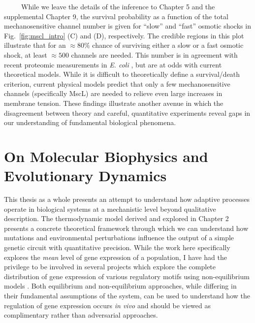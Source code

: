\documentclass[12pt]{caltech_thesis}
\begin{document}
~~~~~While we leave the details of the inference to Chapter 5 and the
supplemental Chapter 9, the survival probability as a function of the
total mechanosensitive channel number is given for ``slow'' and ``fast''
osmotic shocks in Fig.~\ref{fig:mscl_intro} (C) and (D), respectively.
The credible regions in this plot illustrate that for an
\(\approx 80\%\) chance of surviving either a slow or a fast osmotic
shock, at least \(\approx 500\) channels are needed. This number is in
agreement with recent proteomic measurements in \emph{E. coli}
\autocite{li2014,schmidt2016,soufi2015}, but are at odds with current
theoretical models. While it is difficult to theoretically define a
survival/death criterion, current physical models predict that only a
few mechanosensitive channels (specifically MscL) are needed to relieve
even large increases in membrane tension. These findings illustrate
another avenue in which the disagreement between theory and careful,
quantitative experiments reveal gaps in our understanding of fundamental
biological phenomena.

\hypertarget{on-molecular-biophysics-and-evolutionary-dynamics}{%
\section{On Molecular Biophysics and Evolutionary
Dynamics}\label{on-molecular-biophysics-and-evolutionary-dynamics}}

This thesis as a whole presents an attempt to understand how adaptive
processes operate in biological systems at a mechanistic level beyond
qualitative description. The thermodynamic model derived and explored in
Chapter 2 presents a concrete theoretical framework through which we can
understand how mutations and environmental perturbations influence the
output of a simple genetic circuit with quantitative precision. While
the work here specifically explores the \emph{mean} level of gene
expression of a population, I have had the privilege to be involved in
several projects which explore the complete distribution of gene
expression of various regulatory motifs using non-equilibrium models
\autocite{razo-mejia2020,laxhuber2020}. Both equilibrium and
non-equilibrium approaches, while differing in their fundamental
assumptions of the system, can be used to understand how the regulation
of gene expression occurs \emph{in vivo} and should be viewed as
complimentary rather than adversarial approaches.
\end{document}
